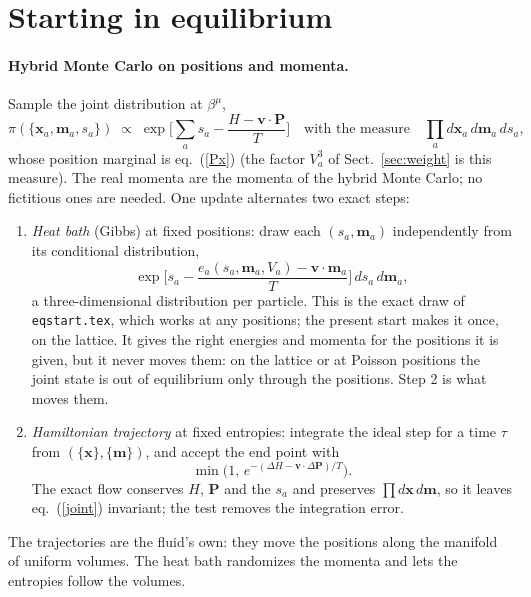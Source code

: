 \documentclass[11pt,aps,preprint,nofootinbib,superscriptaddress,tightenlines]{revtex4-2}
\def\st{\begin{equation}}
\def\stp{\end{equation}}
\def\Eq#1{eq.~(\ref{#1})}
\def\Sect#1{Sect.~\ref{#1}}
\let\oldparagraph\paragraph
\renewcommand{\paragraph}{\par\bigskip\oldparagraph}
\begin{document}
\section{Starting in equilibrium}
\label{sec:sampler}

\paragraph{Hybrid Monte Carlo on positions and momenta.}  Sample the joint distribution at $\beta^\mu$,
\st
\pi(\{\bm x_a,\bm m_a,s_a\})\;\propto\;\exp\Big[\sum_as_a-\frac{H-\bm v\cdot\bm P}{T}\Big]\quad\text{with the measure}\quad\prod_ad\bm x_a\,d\bm m_a\,ds_a ,
\label{joint}
\stp
whose position marginal is \Eq{Px} (the factor $V_a^3$ of \Sect{sec:weight} is this measure).  The real momenta are the
momenta of the hybrid Monte Carlo; no fictitious ones are needed.  One update alternates two exact steps:
\begin{enumerate}
\item \emph{Heat bath} (Gibbs) at fixed positions: draw each $(s_a,\bm m_a)$ independently from its conditional distribution,
  \st
  \exp\Big[s_a-\frac{e_a(s_a,\bm m_a,V_a)-\bm v\cdot\bm m_a}{T}\Big]\,ds_a\,d\bm m_a ,
  \stp
  a three-dimensional distribution per particle.  This is the exact draw of \texttt{eqstart.tex}, which works at any
  positions; the present start makes it once, on the lattice.  It gives the right energies and momenta for the positions it
  is given, but it never moves them: on the lattice or at Poisson positions the joint state is out of equilibrium only
  through the positions.  Step 2 is what moves them.
\item \emph{Hamiltonian trajectory} at fixed entropies: integrate the ideal step for a time $\tau$ from $(\{\bm x\},\{\bm m\})$, and accept
  the end point with
  \st
  \min\big(1,\,e^{-(\Delta H-\bm v\cdot\Delta\bm P)/T}\big) .
  \stp
  The exact flow conserves $H$, $\bm P$ and the $s_a$ and preserves $\prod d\bm x\,d\bm m$, so it leaves \Eq{joint} invariant; the test removes
  the integration error.
\end{enumerate}
The trajectories are the fluid's own: they move the positions along the manifold of uniform volumes.  The heat bath
randomizes the momenta and lets the entropies follow the volumes.
\end{document}
